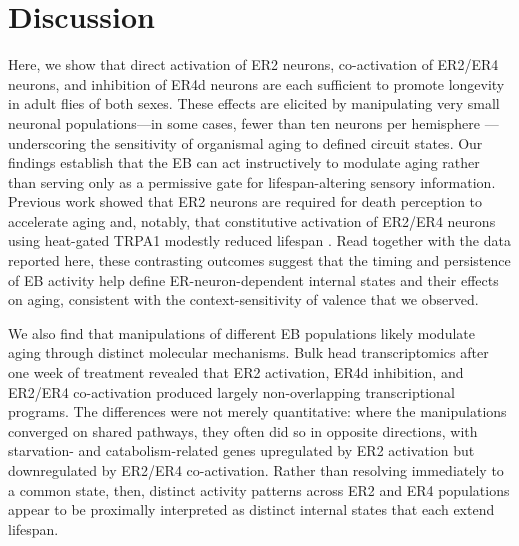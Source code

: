 \section*{Discussion}
Here, we show that direct activation of ER2 neurons, co-activation of ER2/ER4 neurons, and inhibition of ER4d neurons are each sufficient to promote longevity in adult flies of both sexes.
These effects are elicited by manipulating very small neuronal populations---in some cases, fewer than ten neurons per hemisphere \citep{omoto2018,hulse2021}---underscoring the sensitivity of organismal aging to defined circuit states.
Our findings establish that the EB can act instructively to modulate aging rather than serving only as a permissive gate for lifespan-altering sensory information.
Previous work showed that ER2 neurons are required for death perception to accelerate aging \citep{gendron2023} and, notably, that constitutive activation of ER2/ER4 neurons using heat-gated TRPA1 modestly reduced lifespan \citep{gendron2023}.
Read together with the data reported here, these contrasting outcomes suggest that the timing and persistence of EB activity help define ER-neuron-dependent internal states and their effects on aging, consistent with the context-sensitivity of valence that we observed.

We also find that manipulations of different EB populations likely modulate aging through distinct molecular mechanisms.
Bulk head transcriptomics after one week of treatment revealed that ER2 activation, ER4d inhibition, and ER2/ER4 co-activation produced largely non-overlapping transcriptional programs.
The differences were not merely quantitative: where the manipulations converged on shared pathways, they often did so in opposite directions, with starvation- and catabolism-related genes upregulated by ER2 activation but downregulated by ER2/ER4 co-activation.
Rather than resolving immediately to a common state, then, distinct activity patterns across ER2 and ER4 populations appear to be proximally interpreted as distinct internal states that each extend lifespan. 


